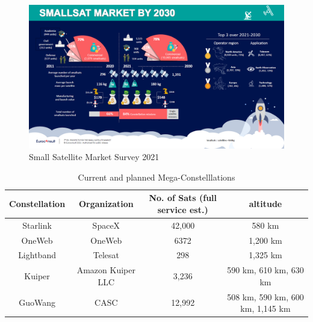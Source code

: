 \begin{figure}[ht]
    \centering
    \includegraphics[width=1\textwidth]{Figures/EuroconsultSmallSatMarketBy2030.PNG}
    \caption{Small Satellite Market Survey 2021 \cite{euroConsult21}}
    \label{fig:smallSatMarket}
\end{figure}


\begin{table}[!ht]
    \centering
    \caption{Current and planned Mega-Constelllations}
    \label{table:constellation}
    \resizebox{\textwidth}{!} {%
    \begin{tabular}{||c c c c||} 
    \hline
    Constellation & Organization & No. of Sats (full service est.) & altitude \\ [0.5ex] 
    \hline\hline
    Starlink\footnotemark[2]{} & SpaceX &  42,000 & 580 km \\ 
    \hline
    OneWeb\footnotemark[3]{} & OneWeb & 6372 & 1,200 km \\
    \hline
    Lightband\footnotemark[4]{} & Telesat & 298 & 1,325 km \\
    \hline
    Kuiper\footnotemark[5]{} & Amazon Kuiper LLC & 3,236 & 590 km, 610 km, 630 km \\
    \hline
    GuoWang\footnotemark[6]{} & CASC & 12,992 & 508 km, 590 km, 600 km, 1,145 km \\ [1ex]
    \hline
    \end{tabular}
    }
\end{table}

